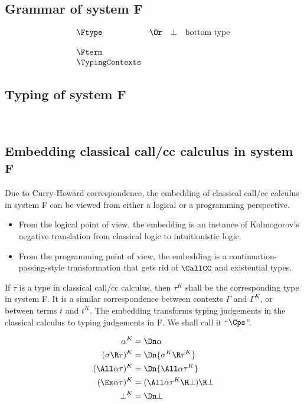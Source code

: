 \documentclass{amsart}
\begin{document}
\subsection{Grammar of system F}

\[
\begin{array}{lclr}
\Ftype
&\Or& \bot & \mbox{bottom type} \\
\\
\Fterm
\\
\TypingContexts
\end{array}
\]

\subsection{Typing of system F}
~

\FRules

\subsection{Embedding classical call/cc calculus in system F}

Due to Curry-Howard correspondence, the embedding of classical
call/cc calculus in system F can be viewed from either a
logical or a programming perspective.
\begin{itemize}
\item From the logical point of view, the embedding is an
instance of Kolmogorov's negative translation from classical
logic to intuitionistic logic.
\item From the programming point of view, the embedding is a
continuation-passing-style transformation that gets rid of
$\CallCC$ and existential types.
\end{itemize}
If $\tau$ is a type in classical call/cc calculus, then $\tau^K$
shall be the corresponding type in system F. It is a similar
correspondence between contexts $\Gamma$ and $\Gamma^K$, or
between terms $t$ and $t^K$. The embedding transforms typing
judgements in the classical calculus to typing judgements in F.
We shall call it ``$\Cps$''.

\begin{align*}
\alpha^K & =
  \Dn\alpha
  \\
(\sigma \R \tau)^K & =
  \Dn{\sigma^K \R \tau^K}
  \\
(\All\alpha\tau)^K & =
  \Dn{\All\alpha\tau^K}
  \\
(\Ex\alpha\tau)^K & =
  (\All\alpha \tau^K \R \bot) \R \bot
  \\
\bot^K & =
  \Dn\bot
\end{align*}
\end{document}
